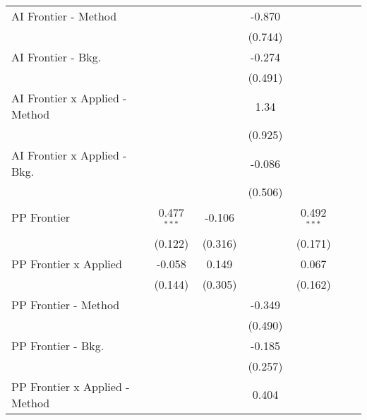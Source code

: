 \begin{tabular}{lcccccc}
   AI Frontier - Method           &               &              & -0.870       &               &        &   \\   
                                  &               &              & (0.744)      &               &        &   \\   
   AI Frontier - Bkg.             &               &              & -0.274       &               &        &   \\   
                                  &               &              & (0.491)      &               &        &   \\   
   AI Frontier x Applied - Method &               &              & 1.34         &               &        &   \\   
                                  &               &              & (0.925)      &               &        &   \\   
   AI Frontier x Applied - Bkg.   &               &              & -0.086       &               &        &   \\   
                                  &               &              & (0.506)      &               &        &   \\   
   PP Frontier                    & 0.477$^{***}$ & -0.106       &              & 0.492$^{***}$ &        &   \\   
                                  & (0.122)       & (0.316)      &              & (0.171)       &        &   \\   
   PP Frontier x Applied          & -0.058        & 0.149        &              & 0.067         &        &   \\   
                                  & (0.144)       & (0.305)      &              & (0.162)       &        &   \\   
   PP Frontier - Method           &               &              & -0.349       &               &        &   \\   
                                  &               &              & (0.490)      &               &        &   \\   
   PP Frontier - Bkg.             &               &              & -0.185       &               &        &   \\   
                                  &               &              & (0.257)      &               &        &   \\   
   PP Frontier x Applied - Method &               &              & 0.404        &               &        &   \\   

\end{tabular}
